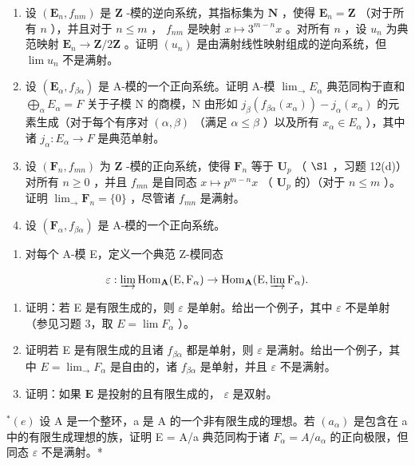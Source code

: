 \BourbakiExercisesSection

\begin{enumerate}
\def\labelenumi{\arabic{enumi}.}
\item
  设 \((\mathbf{E}_n, f_{nm})\) 是 \(\mathbf{Z}\) -模的逆向系统，其指标集为 \(\mathbf{N}\) ，使得 \(\mathbf{E}_n = \mathbf{Z}\) （对于所有 \(n\) ），并且对于 \(n \leqslant m\) ， \(f_{nm}\) 是映射 \(x \mapsto 3^{m - n}x\) 。对所有 \(n\) ，设 \(u_n\) 为典范映射 \(\mathbf{E}_n \to \mathbf{Z}/2\mathbf{Z}\) 。证明 \((u_n)\) 是由满射线性映射组成的逆向系统，但 \(\lim u_n\) 不是满射。
\item
  设 \((\mathbf{E}_{\alpha}, f_{\beta\alpha})\) 是 A-模的一个正向系统。证明 A-模 \(\lim_{\rightarrow} E_{\alpha}\) 典范同构于直和 \(\bigoplus_{\alpha} E_{\alpha} = F\) 关于子模 N 的商模，N 由形如 \(j_{\beta}(f_{\beta\alpha}(x_{\alpha})) - j_{\alpha}(x_{\alpha})\) 的元素生成（对于每个有序对 \((\alpha, \beta)\) （满足 \(\alpha \leqslant \beta\) ）以及所有 \(x_{\alpha} \in E_{\alpha}\) ），其中诸 \(j_{\alpha}: E_{\alpha} \to F\) 是典范单射。
\item
  设 \((\mathbf{F}_n, f_{mn})\) 为 \(\mathbf{Z}\) -模的正向系统，使得 \(\mathbf{F}_n\) 等于 \(\mathbf{U}_p\) （ \(\S 1\) ，习题 12(d)）对所有 \(n \geqslant 0\) ，并且 \(f_{mn}\) 是自同态 \(x \mapsto p^{m-n}x\) （ \(\mathbf{U}_p\) 的）（对于 \(n \leqslant m\) ）。证明 \(\lim_{\longrightarrow} \mathbf{F}_n = \{0\}\) ，尽管诸 \(f_{mn}\) 是满射。
\item
  设 \((\mathbf{F}_{\alpha}, f_{\beta \alpha})\) 是 A-模的一个正向系统。
\end{enumerate}

\begin{enumerate}
\def\labelenumi{(\alph{enumi})}
\tightlist
\item
  对每个 A-模 E，定义一个典范 Z-模同态
\end{enumerate}

\[
\varepsilon : \varinjlim \operatorname{Hom} _ {\mathbf {A}} (\mathrm{E}, \mathrm{F} _ {\alpha}) \rightarrow \operatorname{Hom} _ {\mathbf {A}} (\mathrm{E}, \varinjlim \mathrm{F} _ {\alpha}).
\]

\begin{enumerate}
\def\labelenumi{(\alph{enumi})}
\setcounter{enumi}{1}
\item
  证明：若 E 是有限生成的，则 \(\varepsilon\) 是单射。给出一个例子，其中 \(\varepsilon\) 不是单射（参见习题 3，取 \(E = \lim F_{\alpha}\) ）。
\item
  证明若 E 是有限生成的且诸 \(f_{\beta\alpha}\) 都是单射，则 \(\varepsilon\) 是满射。给出一个例子，其中 \(E = \lim_{\longrightarrow} F_{\alpha}\) 是自由的，诸 \(f_{\beta\alpha}\) 是单射，并且 \(\varepsilon\) 不是满射。
\item
  证明：如果 \(\mathbf{E}\) 是投射的且有限生成的， \(\varepsilon\) 是双射。
\end{enumerate}

\(^{*}(e)\) 设 A 是一个整环，a 是 A 的一个非有限生成的理想。若 \((a_{\alpha})\) 是包含在 a 中的有限生成理想的族，证明 E = A/a 典范同构于诸 \(F_{\alpha} = A/a_{\alpha}\) 的正向极限，但同态 \(\varepsilon\) 不是满射。*
\relax{}
